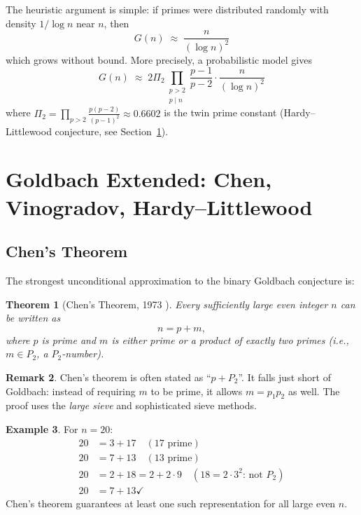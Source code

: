 \documentclass[12pt,a4paper]{amsart}
\newtheorem{theorem}{Theorem}[section]
\theoremstyle{definition}
\newtheorem{example}[theorem]{Example}
\newtheorem{remark}[theorem]{Remark}
\begin{document}
The heuristic argument is simple: if primes were distributed randomly
with density $1/\log n$ near $n$, then
\[
  G(n) \;\approx\; \frac{n}{(\log n)^2}
\]
which grows without bound.  More precisely, a probabilistic model gives
\[
  G(n) \;\approx\; 2 \Pi_2
  \prod_{\substack{p > 2 \\ p \mid n}} \frac{p-1}{p-2}
  \cdot \frac{n}{(\log n)^2}
\]
where $\Pi_2 = \prod_{p > 2} \frac{p(p-2)}{(p-1)^2} \approx 0.6602$
is the twin prime constant (Hardy--Littlewood conjecture, see
Section~\ref{sec:goldbach-ext}).

\section{Goldbach Extended: Chen, Vinogradov, Hardy--Littlewood}
\label{sec:goldbach-ext}

\subsection{Chen's Theorem}

The strongest unconditional approximation to the binary Goldbach
conjecture is:

\begin{theorem}[Chen's Theorem, 1973 \cite{Chen1973}]\label{thm:chen}
Every sufficiently large even integer $n$ can be written as
\[
  n = p + m,
\]
where $p$ is prime and $m$ is either prime or a product of exactly two
primes (i.e., $m \in P_2$, a \emph{$P_2$-number}).
\end{theorem}

\begin{remark}
Chen's theorem is often stated as ``$p + P_2$''.  It falls just short of
Goldbach: instead of requiring $m$ to be prime, it allows $m = p_1 p_2$
as well.  The proof uses the \emph{large sieve} and sophisticated sieve
methods.
\end{remark}

\begin{example}
For $n = 20$:
\begin{align*}
  20 &= 3 + 17 \quad (17 \text{ prime}) \\
  20 &= 7 + 13 \quad (13 \text{ prime}) \\
  20 &= 2 + 18 = 2 + 2 \cdot 9 \quad (18 = 2 \cdot 3^2 \text{: not } P_2) \\
  20 &= 7 + 13 \checkmark
\end{align*}
Chen's theorem guarantees at least one such representation for all large
even $n$.
\end{example}
\end{document}
